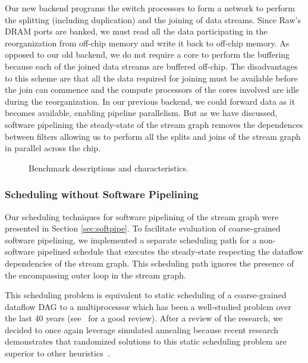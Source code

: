 Our new backend programs the switch processors to form a network to
perform the splitting (including duplication) and the joining of data
streams.  Since Raw's DRAM ports are banked, we must read all the data
participating in the reorganization from off-chip memory and write it
back to off-chip memory.  As opposed to our old backend, we do not
require a core to perform the buffering because each of the joined
data streams are buffered off-chip.  The disadvantages to this scheme
are that all the data required for joining must be available before
the join can commence and the compute processors of the cores involved
are idle during the reorganization.  In our previous backend, we could
forward data as it becomes available, enabling pipeline parallelism.
But as we have discussed, software pipelining the steady-state of the
stream graph removes the dependences between filters allowing us to
perform all the splits and joins of the stream graph in parallel
across the chip.

\begin{figure*}[t]
\centering
{}
\caption{Benchmark descriptions and characteristics.
\protect\label{fig:benchchar}}
\vspace{-6pt}
\end{figure*}

\subsubsection{Scheduling without Software Pipelining}
Our scheduling techniques for software pipelining of the stream graph
were presented in Section \ref{sec:softpipe}.  To facilitate
evaluation of coarse-grained software pipelining, we implemented a
separate scheduling path for a non-software pipelined schedule that
executes the steady-state respecting the dataflow dependencies of the
stream graph.  This scheduling path ignores the presence of the
encompassing outer loop in the stream graph.    

This scheduling problem is equivalent to static scheduling of a
coarse-grained dataflow DAG to a multiprocessor which has been a
well-studied problem over the last 40 years (see~\cite{DAGSched} for a
good review).  After a review of the research, we decided to once
again leverage simulated annealing because recent research
demonstrates that randomized solutions to this static scheduling
problem are superior to other heuristics~\cite{kwok99fastest}. 

